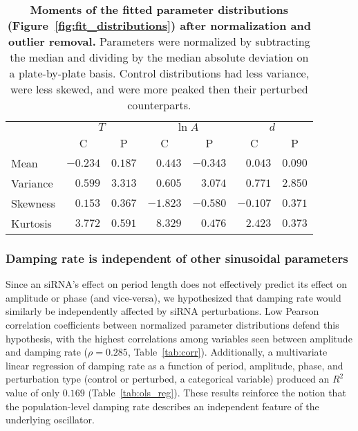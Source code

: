 \documentclass[11pt, letterpaper]{article}
\begin{document}
\begin{table}
  \begin{center}
    \begin{tabular}{lrrrrrr}\toprule
      {} & \multicolumn{2}{c}{$T$} & \multicolumn{2}{c}{$\ln A$} & \multicolumn{2}{c}{$d$} \\
      {}         & \multicolumn{1}{c}{C}         & \multicolumn{1}{c}{P}           & \multicolumn{1}{c}{C}         & \multicolumn{1}{c}{P}               & \multicolumn{1}{c}{C}         & \multicolumn{1}{c}{P}           \\\midrule
      Mean     & $-0.234$ & $0.187$ & $0.443$  & $-0.343$ & $0.043$  & $0.090$    \\
      Variance & $ 0.599$ & $3.313$ & $0.605$  & $ 3.074$ & $0.771$  & $2.850$    \\
      Skewness & $ 0.153$ & $0.367$ & $-1.823$ & $-0.580$ & $-0.107$ & $0.371$    \\
      Kurtosis & $ 3.772$ & $0.591$ & $8.329$  & $ 0.476$ & $2.423$  & $0.373$    \\
      \bottomrule
    \end{tabular}
  \end{center}
  \caption{{\bfseries Moments of the fitted parameter distributions (Figure~\ref{fig:fit_distributions}) after normalization and outlier removal.} Parameters were normalized by subtracting the median and dividing by the median absolute deviation on a plate-by-plate basis. Control distributions had less variance, were less skewed, and were more peaked then their perturbed counterparts.}
  \label{tab:fit_distributions}
\end{table}

\subsubsection*{Damping rate is independent of other sinusoidal parameters}

Since an siRNA's effect on period length does not effectively predict its effect on amplitude or phase (and vice-versa), we hypothesized that damping rate would similarly be independently affected by siRNA perturbations.
Low Pearson correlation coefficients between normalized parameter distributions defend this hypothesis, with the highest correlations among variables seen between amplitude and damping rate ($\rho = 0.285$, Table~\ref{tab:corr}).
Additionally, a multivariate linear regression of damping rate as a function of period, amplitude, phase, and perturbation type (control or perturbed, a categorical variable) produced an $R^2$ value of only $0.169$ (Table~\ref{tab:ols_reg}).
These results reinforce the notion that the population-level damping rate describes an independent feature of the underlying oscillator.
\end{document}
